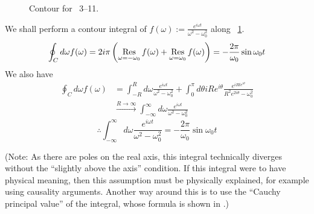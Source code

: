 \item

\begin{figure}[h]
	\centering
	\caption{Contour for ~3--11.}%
	\label{fig:problem3-11}
\end{figure}

We shall perform a contour integral of $f(\omega) := \frac{e^{i\omega t}}{\omega^2 - \omega_0^2}$ along ~\ref{fig:problem3-11}.
\[
	\oint_C d\omega f(\omega)
	= 2i\pi \left( \mathop{\mathrm{Res}}_{\omega = -\omega_0} f(\omega) + \mathop{\mathrm{Res}}_{\omega = \omega_0} f(\omega) \right)
	= -\frac{2\pi}{\omega_0} \sin \omega_0 t
\]
We also have
\begin{align*}
	\oint_C d\omega f(\omega)
	 & = \int_{-R}^R d\omega \frac{e^{i\omega t}}{\omega^2 - \omega_0^2}
	+ \int_0^\pi d\theta iRe^{i\theta} \frac{e^{iRte^{i\theta}}}{R^2 e^{2i\theta} - \omega_0^2}                     \\
	 & \xrightarrow{R \rightarrow \infty} \int_{-\infty}^\infty d\omega \frac{e^{i\omega t}}{\omega^2 - \omega_0^2}
\end{align*}
\[
	\therefore \int_{-\infty}^{\infty} d\omega \frac{e^{i\omega t}}{\omega^2 - \omega_0^2}
	= -\frac{2\pi}{\omega_0} \sin \omega_0 t
\]

(Note: As there are poles on the real axis, this integral technically diverges without the ``slightly above the axis'' condition.
If this integral were to have physical meaning, then this assumption must be physically explained, for example using causality arguments.
Another way around this is to use the ``Cauchy principal value'' of the integral, whose formula is shown in .)